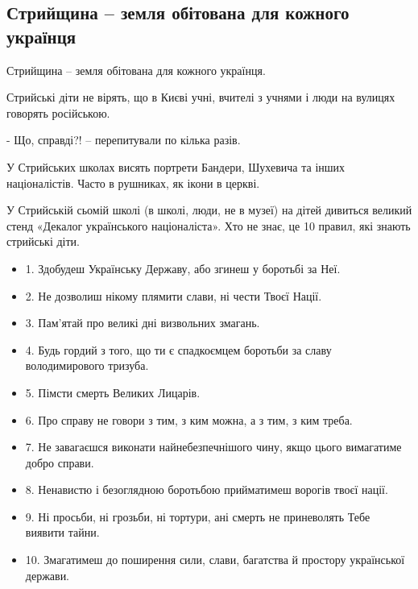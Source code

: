  
 
 
 
 
\subsection{Стрийщина – земля обітована для кожного українця}
\label{sec:16_05_2021.fb.nicoj_larisa.1.stryj_kiev_ukraina_mova}

Стрийщина – земля обітована для кожного українця. 

Стрийські діти не вірять, що в Києві учні, вчителі з учнями і люди на вулицях
говорять російською.  

- Що, справді?! – перепитували по кілька разів. 

У Стрийських школах висять портрети Бандери, Шухевича та інших націоналістів.
Часто в рушниках, як ікони в церкві.

У Стрийській сьомій школі (в школі, люди, не в музеї) на дітей дивиться великий
стенд  «Декалог українського націоналіста». Хто не знає, це 10 правил, які
знають стрийські діти.

\begin{itemize}
  \item 1. Здобудеш Українську Державу, або згинеш у боротьбі за Неї.
  \item 2. Не дозволиш нікому плямити слави, ні чести Твоєї Нації.
  \item 3. Пам’ятай про великі дні визвольних змагань.
  \item 4. Будь гордий з того, що ти є спадкоємцем боротьби за славу володимирового тризуба.
  \item 5. Пімсти смерть Великих Лицарів.
  \item 6. Про справу не говори з тим, з ким можна, а з тим, з ким треба.
  \item 7. Не завагаєшся виконати найнебезпечнішого чину, якщо цього вимагатиме добро справи.
  \item 8. Ненавистю і безоглядною боротьбою прийматимеш ворогів твоєї нації.
  \item 9. Ні просьби, ні грозьби, ні тортури, ані смерть не приневолять Тебе виявити тайни.
  \item 10. Змагатимеш до поширення сили, слави, багатства й простору української держави.
\end{itemize}


